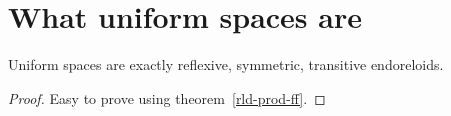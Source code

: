 \section{What uniform spaces are}
\begin{prop}
Uniform spaces are exactly
reflexive, symmetric, transitive endoreloids.\end{prop}
\begin{proof}
Easy to prove using theorem~\ref{rld-prod-ff}.\end{proof}

